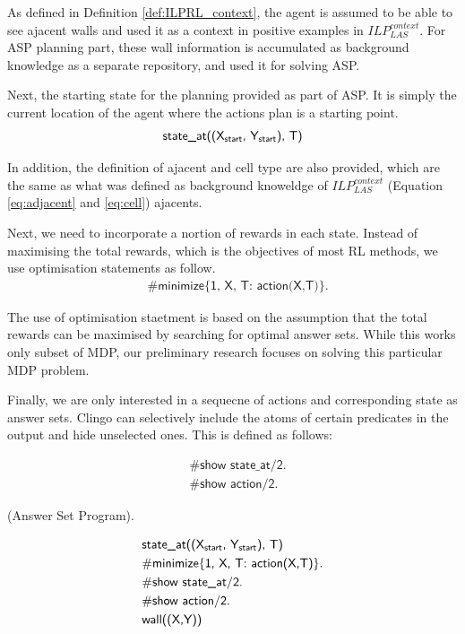 As defined in Definition \ref{def:ILPRL_context}, the agent is assumed to be able to see ajacent walls and used it as a context in positive examples in $ILP_{LAS}^{context}$. 
For ASP planning part, these wall information is accumulated as background knowledge as a separate repository, and used it for solving ASP. 

Next, the starting state for the planning provided as part of ASP. It is simply the current location of the agent where the actions plan is a starting point.
\begin{equation}
\begin{split}
\textsf{state\_at((X\textsubscript{start}, Y\textsubscript{start}), T)}
\end{split}
\end{equation}

In addition, the definition of ajacent and cell type are also provided, which are the same as what was defined as background knoweldge of $ILP_{LAS}^{context}$ (Equation \ref{eq:adjacent} and \ref{eq:cell})
ajacents.

Next, we need to incorporate a nortion of rewards in each state. Instead of maximising the total rewards, which is the objectives of most RL methods, 
we use optimisation statements as follow. 
\begin{equation}
\begin{split}
&\textsf{\#minimize\{1, X, T: action(X,T)\}}.
\end{split}
\end{equation}

The use of optimisation staetment is based on the assumption that the total rewards can be maximised by searching for optimal answer sets. 
While this works only subset of MDP, our preliminary research focuses on solving this particular MDP problem. 
    
Finally, we are only interested in a sequecne of actions and corresponding state as answer sets. 
Clingo can selectively include the atoms of certain predicates in the output and hide unselected ones. 
This is defined as follows:

\begin{equation}
\begin{split}
&\textsf{\#show state\_at/2.} \\
&\textsf{\#show action/2.}
\end{split}
\end{equation}

\begin{examp} \normalfont (Answer Set Program).

\begin{equation}
\begin{split}
&\textsf{state\_at((X\textsubscript{start}, Y\textsubscript{start}), T)}\\
&\textsf{\#minimize\{1, X, T: action(X,T)\}}.\\
&\textsf{\#show state\_at/2.} \\
&\textsf{\#show action/2.}\\
&\textsf{wall((X,Y))}
\end{split}
\end{equation}
\end{examp}

